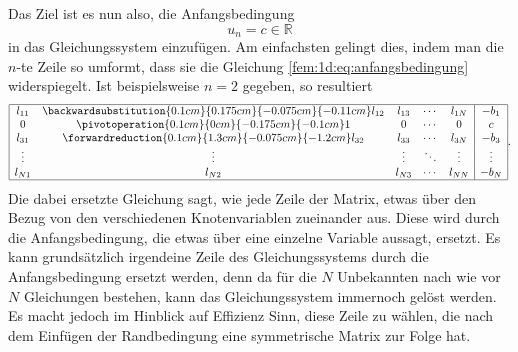 Das Ziel ist es nun also, die Anfangsbedingung
\begin{equation}
    u_n = c \in \mathbb{R} 
    \label{fem:1d:eq:anfangsbedingung}
\end{equation}
in das Gleichungssystem einzufügen.
Am einfachsten gelingt dies, indem man die $n$-te Zeile so umformt, dass sie die Gleichung \eqref{fem:1d:eq:anfangsbedingung} widerspiegelt.
Ist beispielsweise $n = 2$ gegeben, so resultiert
\begin{equation*}
    \begin{array}{|ccccc|c|}
        \hline
        l_{11} & 
        \backwardsubstitution{0.1cm}{0.175cm}{-0.075cm}{-0.11cm}
                 l_{12} & l_{13} & \cdots & l_{1N} & -b_1   \\
        0      & 
        \pivotoperation{0.1cm}{0cm}{-0.175cm}{-0.1cm}
                 1      & 0      & \cdots & 0      & c      \\
        l_{31} & 
        \forwardreduction{0.1cm}{1.3cm}{-0.075cm}{-1.2cm}
                 l_{32} & l_{33} & \cdots & l_{3N} & -b_3   \\
        \vdots & \vdots & \vdots & \ddots & \vdots & \vdots \\
        l_{N1} & l_{N2} & l_{N3} & \cdots & l_{NN} & -b_N   \\
        \hline
    \end{array}.
\end{equation*}
Die dabei ersetzte Gleichung sagt, wie jede Zeile der Matrix, etwas über den Bezug von den verschiedenen Knotenvariablen zueinander aus.
Diese wird durch die Anfangsbedingung, die etwas über eine einzelne Variable aussagt, ersetzt.
Es kann grundsätzlich irgendeine Zeile des Gleichungssystems durch die Anfangsbedingung ersetzt werden, denn da für die $N$ Unbekannten nach wie vor $N$ Gleichungen bestehen, kann das Gleichungssystem immernoch gelöst werden.
Es macht jedoch im Hinblick auf Effizienz Sinn, diese Zeile zu wählen, die nach dem Einfügen der Randbedingung eine symmetrische Matrix zur Folge hat.

